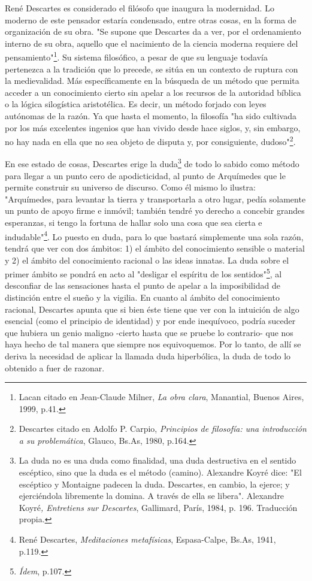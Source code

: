 \documentclass{book}
\begin{document}
René Descartes es considerado el filósofo que inaugura la modernidad. Lo
moderno de este pensador estaría condensado, entre otras cosas, en la
forma de organización de su obra. "Se supone que Descartes da a ver, por
el ordenamiento interno de su obra, aquello que el nacimiento de la
ciencia moderna requiere del pensamiento"\footnote{Lacan citado en
  Jean-Claude Milner, \emph{La obra clara}, Manantial, Buenos Aires,
  1999, p.41.}. Su sistema filosófico, a pesar de que su lenguaje
todavía pertenezca a la tradición que lo precede, se sitúa en un
contexto de ruptura con la medievalidad. Más específicamente en la
búsqueda de un método que permita acceder a un conocimiento cierto sin
apelar a los recursos de la autoridad bíblica o la lógica silogística
aristotélica. Es decir, un método forjado con leyes autónomas de la
razón. Ya que hasta el momento, la filosofía "ha sido cultivada por los
más excelentes ingenios que han vivido desde hace siglos, y, sin
embargo, no hay nada en ella que no sea objeto de disputa y, por
consiguiente, dudoso"\footnote{Descartes citado en Adolfo P. Carpio,
  \emph{Principios de filosofía: una introducción a su problemática},
  Glauco, Bs.As, 1980, p.164.}.

En ese estado de cosas, Descartes erige la duda\footnote{La duda no es
  una duda como finalidad, una duda destructiva en el sentido escéptico,
  sino que la duda es el método (camino). Alexandre Koyré dice: "El
  escéptico y Montaigne padecen la duda. Descartes, en cambio, la
  ejerce; y ejerciéndola libremente la domina. A través de ella se
  libera". Alexandre Koyré\emph{, Entretiens sur Descartes}, Gallimard,
  París, 1984, p. 196. Traducción propia.} de todo lo sabido como método
para llegar a un punto cero de apodicticidad, al punto de Arquímedes que
le permite construir su universo de discurso. Como él mismo lo ilustra:
"Arquímedes, para levantar la tierra y transportarla a otro lugar, pedía
solamente un punto de apoyo firme e inmóvil; también tendré yo derecho a
concebir grandes esperanzas, si tengo la fortuna de hallar solo una cosa
que sea cierta e indudable"\footnote{René Descartes, \emph{Meditaciones
  metafísicas}, Espasa-Calpe, Bs.As, 1941, p.119.}. Lo puesto en duda,
para lo que bastará simplemente una sola razón, tendrá que ver con dos
ámbitos: 1) el ámbito del conocimiento sensible o material y 2) el
ámbito del conocimiento racional o las ideas innatas. La duda sobre el
primer ámbito se pondrá en acto al "desligar el espíritu de los
sentidos"\footnote{\emph{Ídem}, p.107.}, al desconfiar de las
sensaciones hasta el punto de apelar a la imposibilidad de distinción
entre el sueño y la vigilia. En cuanto al ámbito del conocimiento
racional, Descartes apunta que si bien éste tiene que ver con la
intuición de algo esencial (como el principio de identidad) y por ende
inequívoco, podría suceder que hubiera un genio maligno -cierto hasta
que se pruebe lo contrario- que nos haya hecho de tal manera que siempre
nos equivoquemos. Por lo tanto, de allí se deriva la necesidad de
aplicar la llamada duda hiperbólica, la duda de todo lo obtenido a fuer
de razonar.
\end{document}

